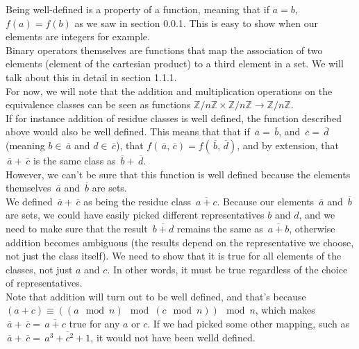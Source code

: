 \documentclass[12pt]{article}
\newcommand{\Z}{\mathbb{Z}}
\newcommand{\olsi}[1]{\,\overline{{#1}}}
\begin{document}
    Being well-defined is a property of a function,
    meaning that if $a = b$, $f(a) = f(b)$
    as we saw in section 0.0.1.
    This is easy to show when our elements are integers for example. \\
    Binary operators themselves are functions that
    map the association of two elements
    (element of the cartesian product) to a third element in a set.
    We will talk about this in detail in section 1.1.1. \\
    For now, we will note that the addition and multiplication
    operations on the equivalence classes can be seen as
    functions $\Z/n\Z \times \Z/n\Z \to \Z/n\Z$. \\
    If for instance addition of residue classes is well defined,
    the function described above would also be well defined.
    This means that that if $\olsi{a} = \olsi{b}$,
    and $\olsi{c} = \olsi{d}$
    (meaning $b \in \olsi{a}$ and $d \in \olsi{c}$),
    that $f(\olsi{a}, \olsi{c}) = f(\olsi{b}, \olsi{d})$,
    and by extension, that $\olsi{a} + \olsi{c}$
    is the same class as $\olsi{b} + \olsi{d}$. \\
    However, we can't be sure that this function is well defined
    because the elements themselves
    $\olsi{a}$ and $\olsi{b}$ are sets. \\
    We defined $\olsi{a} + \olsi{c}$
    as being the residue class $\olsi{a + c}$.
    Because our elements $\olsi{a}$ and $\olsi{b}$ are sets,
    we could have easily picked different representatives
    $b$ and $d$,
    and we need to make sure that the result $\olsi{b + d}$
    remains the same as $\olsi{a+b}$,
    otherwise addition becomes ambiguous
    (the results depend on the representative we choose,
    not just the class itself).
    We need to show that it is true for all elements of the classes,
    not just $a$ and $c$.
    In other words, it must be true regardless
    of the choice of representatives. \\
    Note that addition will turn out to be well defined,
    and that's because
    $(a + c) \equiv ((a \mod n) \mod (c \mod n)) \mod n$,
    which makes $\olsi{a} + \olsi{c} = \olsi{a + c}$
    true for any $a$ or $c$.
    If we had picked some other mapping,
    such as $\olsi{a} + \olsi{c} = \olsi{a^3 + c^2 + 1}$,
    it would not have been welld defined. \\
\end{document}
